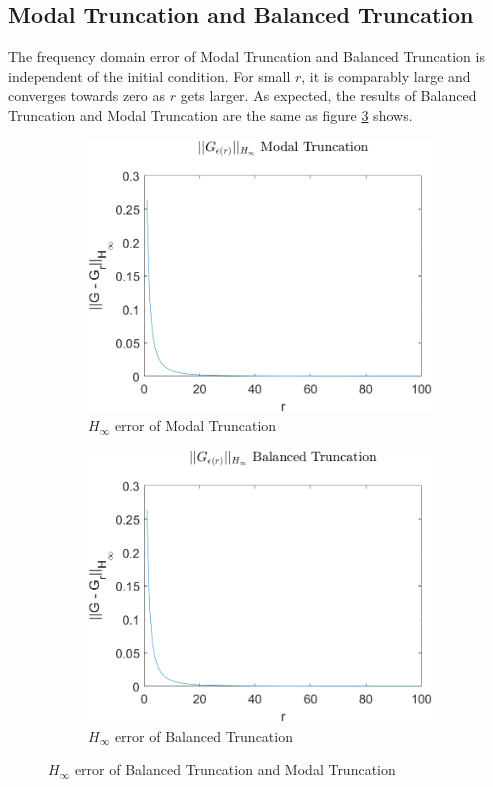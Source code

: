 \subsection{Modal Truncation and Balanced Truncation}
The frequency domain error of Modal Truncation and Balanced Truncation is independent of the initial condition.
For small \(r\), it is comparably large and converges towards zero as \(r\) gets larger.
As expected, the results of Balanced Truncation and Modal Truncation are the same as figure \ref{FIG-H-BTMT} shows.
\begin{figure}[H]
\begin{subfigure}[b]{0.5\textwidth}
\centering
\includegraphics[width=\textwidth]{images/freq/H_MT}
\caption{$H_{\infty}$ error of Modal Truncation}
\label{FIG-H-MT}
\end{subfigure}
\begin{subfigure}[b]{0.5\textwidth}
\centering
\includegraphics[width=\textwidth]{images/freq/H_BT}
\caption{$H_{\infty}$ error of Balanced Truncation}
\label{FIG-H-BT}
\end{subfigure}
\caption{$H_{\infty}$ error of Balanced Truncation and Modal Truncation}
\label{FIG-H-BTMT}
\end{figure}


